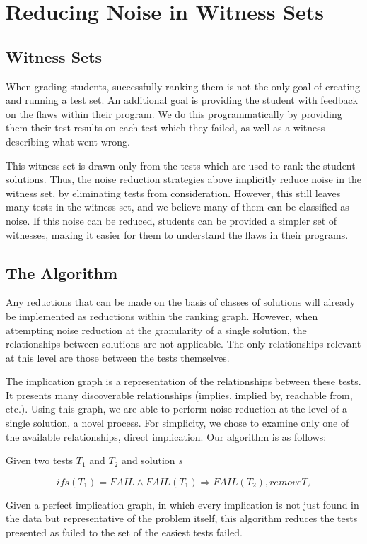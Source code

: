 \documentclass[11pt,twoside]{article}
\newcommand\fail{\mathit{FAIL}}
\begin{document}
\section{Reducing Noise in Witness Sets}
\subsection{Witness Sets}
When grading students, successfully ranking them is not the only goal of creating and running a test set. An additional goal is providing the student with feedback on the flaws within their program. We do this programmatically by providing them their test results on each test which they failed, as well as a witness describing what went wrong.

This witness set is drawn only from the tests which are used to rank the student solutions. Thus, the noise reduction strategies above implicitly reduce noise in the witness set, by eliminating tests from consideration. However, this still leaves many tests in the witness set, and we believe many of them can be classified as noise. If this noise can be reduced, students can be provided a simpler set of witnesses, making it easier for them to understand the flaws in their programs.

\subsection{The Algorithm}
Any reductions that can be made on the basis of classes of solutions will already be implemented as reductions within the ranking graph. However, when attempting noise reduction at the granularity of a single solution, the relationships between solutions are not applicable. The only relationships relevant at this level  are those between the tests themselves.

The implication graph is a representation of the relationships between these tests. It presents many discoverable relationships (implies, implied by, reachable from, etc.). Using this graph, we are able to perform noise reduction at the level of a single solution, a novel process. For simplicity, we chose to examine only one of the available relationships, direct implication. Our algorithm is as follows:

\centerline{Given two tests $T_1$ and $T_2$ and solution $s$}
$$if s(T_1) = \fail \wedge \fail(T_1) \Rightarrow \fail(T_2), remove T_2$$

Given a perfect implication graph, in which every implication is not just found in the data but representative of the problem itself, this algorithm reduces the tests presented as  failed to the set of the easiest tests failed. 
\end{document}
